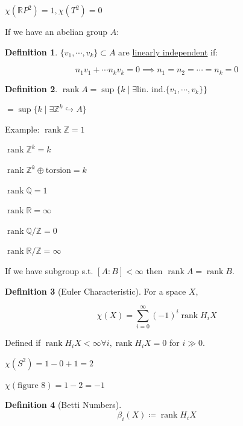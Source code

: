 \documentclass{article}
\theoremstyle{definition}
\newtheorem*{definition}{Definition}
\begin{document}
    \(\chi(\mathbb{R} P^2)=1, \chi(T^2)=0\) 

    If we have an abelian group \(A\):

    \begin{definition}
        \(\{ v_1, \cdots , v_k \} \subset A\) are \underline{linearly independent} if:

        \[
            n_1 v_1 + \cdots n_k v_k = 0 \implies n_1 = n_2 = \cdots = n_k = 0
        \]
    \end{definition}

    \begin{definition}
        \(\operatorname{rank} A = \sup \{ k \mid \exists \text{lin. ind.} \{ v_1, \cdots , v_k \}  \} \)

        \(= \sup \{ k \mid \exists \mathbb{Z}^k \hookrightarrow A \} \) 
    \end{definition}

    Example: \(\operatorname{rank} \mathbb{Z} = 1\)

    \(\operatorname{rank} \mathbb{Z}^k = k\)

    \(\operatorname{rank} \mathbb{Z}^k \oplus \text{torsion} = k\) 

    \(\operatorname{rank} \mathbb{Q} = 1\)

    \(\operatorname{rank} \mathbb{R} = \infty\) 

    \(\operatorname{rank} \mathbb{Q} / \mathbb{Z} = 0\) 

    \(\operatorname{rank} \mathbb{R} / \mathbb{Z} = \infty\) 

    If we have subgroup s.t. \([A:B] < \infty\) then \(\operatorname{rank} A = \operatorname{rank} B\).

    \begin{definition}
        [Euler Characteristic] For a space \(X\),

        \[
            \chi (X) = \sum_{i=0}^{\infty} (-1)^i \operatorname{rank} H_i X
        \]

        Defined if \(\operatorname{rank} H_i X < \infty \forall i, \operatorname{rank} H_i X = 0\) for \(i \gg 0\). 
    \end{definition}

    \(\chi(S^2) = 1 - 0 + 1 = 2\) 

    \(\chi(\text{figure } 8) = 1-2 = -1\) 

    \begin{definition}
        [Betti Numbers]

        \[
            \beta_i(X) \coloneqq \operatorname{rank} H_i X
        \]
    \end{definition}
\end{document}
